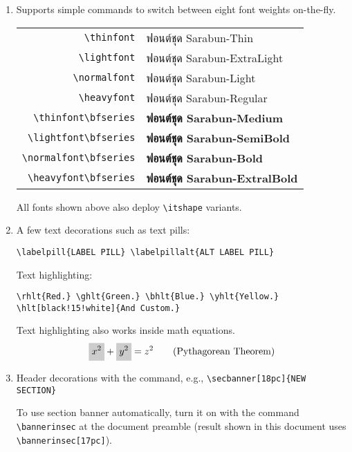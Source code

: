 \begin{enumerate}
\item Supports simple commands to switch between eight font weights on-the-fly.
    \begin{center}
        \begin{tabular}{rl}
            \lstinline"\thinfont"            & {\thinfont ฟอนต์ชุด Sarabun-Thin}                   \\
            \lstinline"\lightfont"           & {\lightfont ฟอนต์ชุด Sarabun-ExtraLight}            \\
            \lstinline"\normalfont"          & {\normalfont ฟอนต์ชุด Sarabun-Light}                \\
            \lstinline"\heavyfont"           & {\heavyfont ฟอนต์ชุด Sarabun-Regular}               \\
            \lstinline"\thinfont\bfseries"   & {\thinfont\bfseries ฟอนต์ชุด Sarabun-Medium}        \\
            \lstinline"\lightfont\bfseries"  & {\lightfont\bfseries ฟอนต์ชุด Sarabun-SemiBold}     \\
            \lstinline"\normalfont\bfseries" & {\normalfont\bfseries ฟอนต์ชุด Sarabun-Bold}        \\
            \lstinline"\heavyfont\bfseries"  & {\heavyfont\bfseries ฟอนต์ชุด Sarabun-ExtralBold}   \\
        \end{tabular}
    \end{center}
    All fonts shown above also deploy \lstinline"\itshape" variants.

\item A few text decorations such as text pills:  
\begin{lstlisting}[numbers=none]
\labelpill{LABEL PILL} \labelpillalt{ALT LABEL PILL}
\end{lstlisting}
    Text highlighting:     
\begin{lstlisting}[numbers=none]
\rhlt{Red.} \ghlt{Green.} \bhlt{Blue.} \yhlt{Yellow.}
\hlt[black!15!white]{And Custom.}
\end{lstlisting}
    Text highlighting also works inside math equations.
    \begin{equation}
        \hlt{x^2} + \hlt{y^2} = z^2  \tag{Pythagorean Theorem}
    \end{equation}

\item Header decorations with the command, e.g., \lstinline"\secbanner[18pc]{NEW SECTION}"
    \begin{center}
        \Large\heavyfont\bfseries{}
    \end{center}
    To use section banner automatically, turn it on with the command \lstinline"\bannerinsec" 
    at the document preamble (result shown in this document uses \lstinline"\bannerinsec[17pc]").


\end{enumerate}
